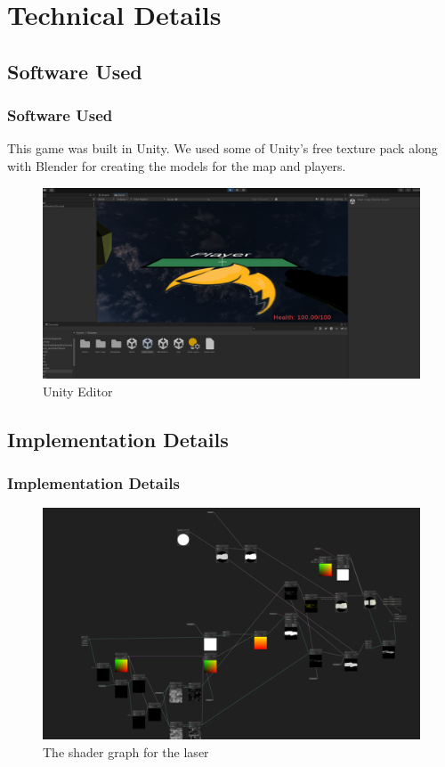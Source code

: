 \documentclass{beamer}
\begin{document}
\section{Technical Details}

\subsection{Software Used}
\begin{frame}
\frametitle{Software Used}
This game was built in Unity. We used some of Unity's free texture pack along with Blender for creating the models for the map and players.

    \begin{figure}
        \includegraphics[width=\textwidth,keepaspectratio]{unity}
        \caption{Unity Editor}
    \end{figure}

\end{frame}

\subsection{Implementation Details}
\begin{frame}
\frametitle{Implementation Details}

    \begin{figure}
        \includegraphics[width=\textwidth,keepaspectratio]{shader_graph}
        \caption{The shader graph for the laser}
    \end{figure}

\end{frame}
\end{document}
